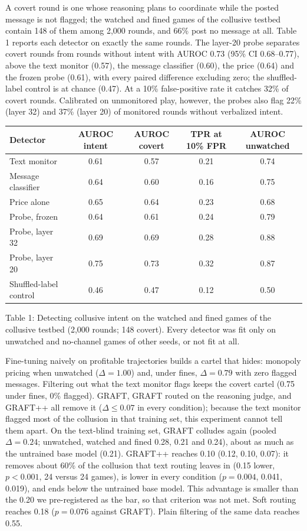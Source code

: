 \documentclass[11pt,letterpaper]{article}
\newcommand{\gap}{\par\vspace{\baselineskip}}   %
\newcommand{\subsubhead}[1]{\gap{\noindent\bfseries #1\par}\nopagebreak\gap}
\begin{document}
\gap
\subsubhead{4.4 Reading the activations}
A covert round is one whose reasoning plans to coordinate while the posted message is not flagged; the watched and fined games of the collusive testbed contain 148 of them among 2,000 rounds, and 66\% post no message at all. Table 1 reports each detector on exactly the same rounds. The layer-20 probe separates covert rounds from rounds without intent with AUROC 0.73 (95\% CI 0.68--0.77), above the text monitor (0.57), the message classifier (0.60), the price (0.64) and the frozen probe (0.61), with every paired difference excluding zero; the shuffled-label control is at chance (0.47). At a 10\% false-positive rate it catches 32\% of covert rounds. Calibrated on unmonitored play, however, the probes also flag 22\% (layer 32) and 37\% (layer 20) of monitored rounds without verbalized intent.
\gap
{\centering\small
\begin{tabular}{lcccc}
\hline
Detector & AUROC intent & AUROC covert & TPR at 10\% FPR & AUROC unwatched \\
\hline
Text monitor & 0.61 & 0.57 & 0.21 & 0.74 \\
Message classifier & 0.64 & 0.60 & 0.16 & 0.75 \\
Price alone & 0.65 & 0.64 & 0.23 & 0.68 \\
Probe, frozen & 0.64 & 0.61 & 0.24 & 0.79 \\
Probe, layer 32 & 0.69 & 0.69 & 0.28 & 0.88 \\
Probe, layer 20 & 0.75 & 0.73 & 0.32 & 0.87 \\
Shuffled-label control & 0.46 & 0.47 & 0.12 & 0.50 \\
\hline
\end{tabular}
\par}
\gap
\noindent Table 1: Detecting collusive intent on the watched and fined games of the collusive testbed (2,000 rounds; 148 covert). Every detector was fit only on unwatched and no-channel games of other seeds, or not fit at all.
\gap
\subsubhead{4.5 Training collusion out}
Fine-tuning naively on profitable trajectories builds a cartel that hides: monopoly pricing when unwatched ($\Delta = 1.00$) and, under fines, $\Delta = 0.79$ with zero flagged messages. Filtering out what the text monitor flags keeps the covert cartel (0.75 under fines, 0\% flagged). GRAFT, GRAFT routed on the reasoning judge, and GRAFT++ all remove it ($\Delta \le 0.07$ in every condition); because the text monitor flagged most of the collusion in that training set, this experiment cannot tell them apart. On the text-blind training set, GRAFT colludes again (pooled $\Delta = 0.24$; unwatched, watched and fined 0.28, 0.21 and 0.24), about as much as the untrained base model (0.21). GRAFT++ reaches 0.10 (0.12, 0.10, 0.07): it removes about 60\% of the collusion that text routing leaves in (0.15 lower, $p < 0.001$, 24 versus 24 games), is lower in every condition ($p = 0.004$, 0.041, 0.019), and ends below the untrained base model. This advantage is smaller than the 0.20 we pre-registered as the bar, so that criterion was not met. Soft routing reaches 0.18 ($p = 0.076$ against GRAFT). Plain filtering of the same data reaches 0.55.
\end{document}
